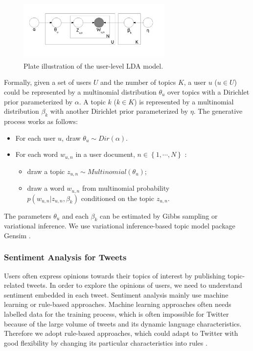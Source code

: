 \documentclass[smallcondensed]{svjour3}     %
\begin{document}
\begin{figure}[htb]
\centering
\includegraphics[width=3.0in,height=1.2in]{LDA.pdf}
\caption{Plate illustration of the user-level LDA model.}
\label{fig:graph2}
\end{figure}

Formally, given a set of users $ U $ and the number of topics $ K $, a user $u$ ($ u \in U $) could be represented by a multinomial distribution $ \theta_{u} $ over topics with a Dirichlet prior parameterized by $ \alpha $. 
A topic $ k $ ($ k \in K $) is represented by a multinomial distribution $ \beta_{k} $ with another Dirichlet prior parameterized by $ \eta $. 
The generative process works as follows:
\begin{itemize}
\item For each user $ u $, draw $ \theta_{u} \sim Dir \left(  \alpha \right) $.
\item For each word $ w_{u,n} $ in a user document, $ n \in \left\lbrace 1, \cdots, N \right\rbrace $ :
\begin{itemize}
\item draw a topic $ z_{u,n} \sim Multinomial \left( \theta_{u}  \right) $;
\item draw a word $ w_{u,n} $ from multinomial probability\\ $  p \left( w_{u,n} \vert z_{u,n}, \beta_{k}  \right) $ conditioned on the topic $ z_{u,n} $.
\end{itemize}
\end{itemize}
The parameters $ \theta_{u} $ and each $ \beta_{k} $ can be estimated by Gibbs sampling or variational inference.
We use variational inference-based topic model package Gensim \cite{rehurek_lrec}.

\subsubsection{Sentiment Analysis for Tweets}
\label{sentiment}
Users often express opinions towards their topics of interest by publishing topic-related tweets. 
In order to explore the opinions of users, we need to understand sentiment embedded in each tweet.
Sentiment analysis mainly use machine learning or rule-based approaches. 
Machine learning approaches often needs labelled data for the training process, which is often impossible for Twitter because of the large volume of tweets and its dynamic language characteristics. Therefore we adopt rule-based approaches, which could adapt to Twitter with good flexibility by changing its particular characteristics into rules \cite{Thelwall:2010SSS,Hu:2013www}.
\end{document}
